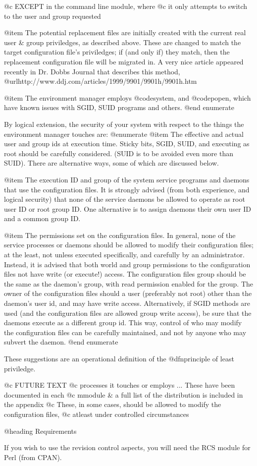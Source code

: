 @c EXCEPT in the command line module, where
@c it only attempts to switch to the user and group requested

@item The potential replacement files are initially created with the current
real user & group priviledges, as described above.  These are changed to match
the target configuration file's priviledges; if (and only if) they match, then
the replacement configuration file will be migrated in.  A very nice article
appeared recently in Dr. Dobbs Journal that describes this method,
@url{http://www.ddj.com/articles/1999/9901/9901h/9901h.htm}

@item The environment manager employs @code{system}, and @code{popen}, which
have known issues with SGID, SUID programs and others.
@end enumerate

By logical extension, the security of your system with respect to the things
the environment manager touches are:
@enumerate
@item The effective and actual user and group ids at execution time.  Sticky
bits, SGID, SUID, and executing as root should be carefully considered.  (SUID
is to be avoided even more than SUID). There are alternative ways, some of
which are discussed below.

@item The execution ID and group of the system service programs and daemons
that use the configuration files.  It is strongly advised (from both
experience, and logical security) that none of the service daemons be allowed
to operate as root user ID or root group ID.  One alternative is to assign
daemons their own user ID and a common group ID.

@item The permissions set on the configuration files.  In general, none of the
service processes or daemons should be allowed to modify their configuration
files; at the least, not unless executed specifically, and carefully by an
administrator.  Instead, it is advised that both world and group permissions
to the configuration files not have write (or execute!) access.  The
configuration files group should be the same as the daemon's group, with read
permission enabled for the group.  The owner of the configuration files should
a user (preferably not root) other than the daemon's user id, and may have
write access.  Alternatively, if SGID methods are used (and the configuration
files are allowed group write access), be sure that the daemons execute as a
different group id.   This way, control of who may modify the configuration
files can be carefully maintained, and not by anyone who may subvert the
daemon.
@end enumerate

These suggestions are an operational definition of the @dfn{principle of least
priviledge}.

@c FUTURE TEXT
@c processes it touches or employs ... These have been documented in each
@c mmodule & a full list of the distribution is included in the appendix
@c These, in some cases, should be allowed to modify the configuration files,
@c atleast under controlled circumstances


@heading Requirements

If you wish to use the revision control aspects, you will need the RCS module
for Perl (from CPAN).
